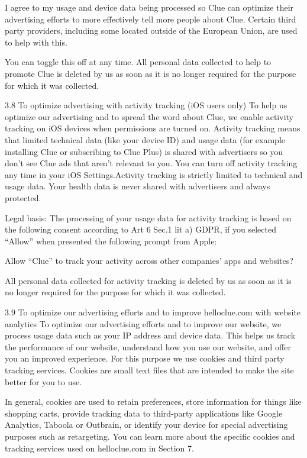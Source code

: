 I agree to my usage and device data being processed so Clue can optimize their advertising efforts to more effectively tell more people about Clue. Certain third party providers, including some located outside of the European Union, are used to help with this.

You can toggle this off at any time. All personal data collected to help to promote Clue is deleted by us as soon as it is no longer required for the purpose for which it was collected.

3.8 To optimize advertising with activity tracking (iOS users only)
To help us optimize our advertising and to spread the word about Clue, we enable activity tracking on iOS devices when permissions are turned on. Activity tracking means that limited technical data (like your device ID) and usage data (for example installing Clue or subscribing to Clue Plus) is shared with advertisers so you don’t see Clue ads that aren’t relevant to you. You can turn off activity tracking any time in your iOS Settings.Activity tracking is strictly limited to technical and usage data. Your health data is never shared with advertisers and always protected.

Legal basis: The processing of your usage data for activity tracking is based on the following consent according to Art 6 Sec.1 lit a) GDPR, if you selected “Allow” when presented the following prompt from Apple:

Allow “Clue” to track your activity across other companies’ apps and websites?

All personal data collected for activity tracking is deleted by us as soon as it is no longer required for the purpose for which it was collected.

3.9 To optimize our advertising efforts and to improve helloclue.com with website analytics
To optimize our advertising efforts and to improve our website, we process usage data such as your IP address and device data. This helps us track the performance of our website, understand how you use our website, and offer you an improved experience. For this purpose we use cookies and third party tracking services. Cookies are small text files that are intended to make the site better for you to use.

In general, cookies are used to retain preferences, store information for things like shopping carts, provide tracking data to third-party applications like Google Analytics, Taboola or Outbrain, or identify your device for special advertising purposes such as retargeting. You can learn more about the specific cookies and tracking services used on helloclue.com in Section 7.


